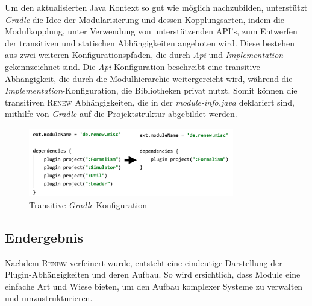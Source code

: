 	Um den aktualisierten Java Kontext so gut wie möglich nachzubilden, unterstützt \textit{Gradle} die Idee der  Modularisierung und dessen Kopplungsarten, indem die Modulkopplung, unter Verwendung von unterstützenden API's, zum Entwerfen der transitiven und statischen Abhängigkeiten angeboten wird. Diese bestehen aus zwei weiteren Konfigurationspfaden, die durch \textit{Api} und \textit{Implementation} gekennzeichnet sind. Die \textit{Api} Konfiguration beschreibt eine transitive Abhängigkeit, die durch die Modulhierarchie weitergereicht wird, während die \textit{Implementation}-Konfiguration, die Bibliotheken privat nutzt. Somit können die transitiven \textsc{Renew} Abhängigkeiten, die in der \textit{module-info.java} deklariert sind, mithilfe von \textit{Gradle} auf die Projektstruktur abgebildet werden.

	\begin{figure}[h!]
	  \centering
	  \includegraphics[width=0.8\textwidth]{material/images/gradle_misc.png}
	  \caption{Transitive \textit{Gradle} Konfiguration}
	  \label{fig:trans_gradle}
	\end{figure}

\subsection{Endergebnis} \label{sub:endergebnis}
	Nachdem \textsc{Renew} verfeinert wurde, entsteht eine eindeutige Darstellung der Plugin-Abhängigkeiten und deren Aufbau. So wird ersichtlich, dass Module eine einfache Art und Wiese bieten, um den Aufbau komplexer Systeme zu verwalten und umzustrukturieren.

